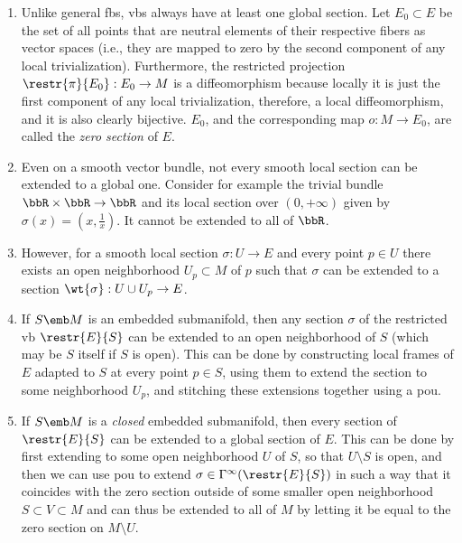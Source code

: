 \begin{rem}\label{rem zero section, extending section}
\begin{enumerate}
    \item Unlike general \glspl{fb}, \glspl{vb} always have at least one global section. Let $E_0\subset E$ be the set of all points that are neutral elements of their respective fibers as vector spaces (i.e., they are mapped to zero by the second component of any local trivialization). Furthermore, the restricted projection $\restr{\pi}{E_0}:E_0\to M$ is a diffeomorphism because locally it is just the first component of any local trivialization, therefore, a local diffeomorphism, and it is also clearly bijective. $E_0$, and the corresponding map $o:M\to E_0$, are called the \emph{zero section} of $E$.
    \item Even on a smooth vector bundle, not every smooth local section can be extended to a global one. Consider for example the trivial bundle $\bbR\times\bbR\to \bbR$ and its local section over $(0,+\infty)$ given by $\sigma(x)=(x,\frac 1x)$. It cannot be extended to all of $\bbR$. 
    \item However, for a smooth local section $\sigma:U\to E$ and every point $p\in U$ there exists an open neighborhood $U_p\subset M$ of $p$ such that $\sigma$ can be extended to a section $\wt{\sigma}:U\cup U_p\to E$.
    \item If $S\emb M$ is an embedded submanifold, then any section $\sigma$ of the restricted \gls{vb} $\restr{E}{S}$ can be extended to an open neighborhood of $S$ (which may be $S$ itself if $S$ is open). This can be done by constructing local frames of $E$ adapted to $S$ at every point $p\in S$, using them to extend the section to some neighborhood $U_p$, and stitching these extensions together using a \gls{pou}.
    \item If $S\emb M$ is a \emph{closed} embedded submanifold, then every section of $\restr{E}{S}$ can be extended to a global section of $E$. This can be done by first extending to some open neighborhood $U$ of $S$, so that $U\setminus S$ is open, and then we can use \gls{pou} to extend $\sigma\in\Gamma^\infty(\restr{E}{S})$ in such a way that it coincides with the zero section outside of some smaller open neighborhood $S\subset V\subset M$ and can thus be extended to all of $M$ by letting it be equal to the zero section on $M\setminus U$.
\end{enumerate}
\end{rem}


